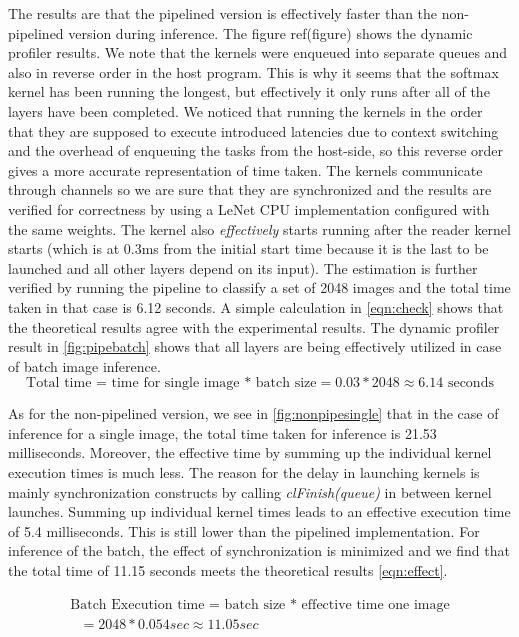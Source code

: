 The results are that the pipelined version is effectively faster than the non-pipelined version during inference. The figure ref(figure) shows the dynamic profiler results. We note that the kernels were enqueued into separate queues and also in reverse order in the host program. This is why it seems that the softmax kernel has been running the longest, but effectively it only runs after all of the layers have been completed. We noticed that running the kernels in the order that they are supposed to execute introduced latencies due to context switching and the overhead of enqueuing the tasks from the host-side, so this reverse order gives a more accurate representation of time taken. The kernels communicate through channels so we are sure that they are synchronized and the results are verified for correctness by using a LeNet CPU implementation configured with the same weights. The kernel also \emph{effectively} starts running after the reader kernel starts (which is at 0.3ms from the initial start time because it is the last to be launched and all other layers depend on its input). 
The estimation is further verified by running the pipeline to classify a set of 2048 images and the total time taken in that case is 6.12 seconds. A simple calculation in \ref{eqn:check} shows that the theoretical results agree with the experimental results. The dynamic profiler result in \ref{fig:pipebatch} shows that all layers are being effectively utilized in case of batch image inference. 
\begin{equation}
\text{Total time = time for single image * batch size} = 0.03 * 2048 \approx 6.14\text{ seconds}
\label{eqn:check}
\end{equation}

As for the non-pipelined version, we see in \ref{fig:nonpipesingle} that in the case of inference for a single image,  the total time taken for inference is 21.53 milliseconds. Moreover, the effective time by summing up the individual kernel execution times is much less. The reason for the delay in launching kernels is mainly synchronization constructs by calling \emph{clFinish(queue)} in between kernel launches. Summing up individual kernel times leads to an effective execution time of 5.4 milliseconds. This is still lower than the pipelined implementation. For inference of the batch, the effect of synchronization is minimized and we find that the total time of 11.15 seconds meets the theoretical results \ref{eqn:effect}.

\begin{equation}
\begin{array}{l}

\text{Batch Execution time = batch size * effective time one image} \\
  \text{        } = 2048 * 0.054 sec \approx 11.05 sec
\end{array}
\label{eqn:effect}
\end{equation}


